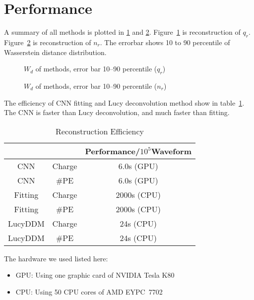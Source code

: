 \section{Performance} %
A summary of all methods is plotted in \ref{fig:chargesummary} and \ref{fig:penumsummary}. Figure~\ref{fig:chargesummary} is reconstruction of $q_{r}$. Figure~\ref{fig:penumsummary} is reconstruction of $n_{r}$. The errorbar shows 10 to 90 percentile of Wasserstein distance distribution. 
\begin{minipage}{.5\textwidth}
\begin{figure}[H]
    \centering
    \resizebox{\textwidth}{!}{}
    \caption{\label{fig:chargesummary} $W_{d}$ of methods, error bar 10--90 percentile ($q_{r}$)}
\end{figure}
\end{minipage}
\begin{minipage}{.5\textwidth}
\begin{figure}[H]
    \centering
    \resizebox{\textwidth}{!}{}
    \caption{\label{fig:penumsummary} $W_{d}$ of methods, error bar 10--90 percentile ($n_{r}$)}
\end{figure}
\end{minipage}

The efficiency of CNN fitting and Lucy deconvolution method show in table~\ref{fig:efficiency}. The CNN is faster than Lucy deconvolution, and much faster than fitting. 

\begin{table}[H]
    \centering
    \caption{\label{fig:efficiency} Reconstruction Efficiency}
    \begin{tabular}{c|c|c}
        \hline
        & & Performance/$10^{5}$Waveform \\
        \hline
        CNN & Charge & 6.0s (GPU) \\
        \hline
        CNN & \#PE & 6.0s (GPU)\\
        \hline
        Fitting & Charge & 2000s (CPU) \\
        \hline
        Fitting & \#PE & 2000s (CPU) \\
        \hline
        LucyDDM & Charge & 24s (CPU) \\
        \hline
        LucyDDM & \#PE & 24s (CPU) \\
        \hline
    \end{tabular}
\end{table}
\hspace{4mm}

The hardware we used listed here: 
\begin{center}
\begin{itemize}
    \item GPU: Using one graphic card of NVIDIA\textsuperscript{\textregistered} Tesla\textsuperscript{\textregistered} K80
    \item CPU: Using 50 CPU cores of AMD EYPC\texttrademark\ 7702
\end{itemize}
\end{center}

